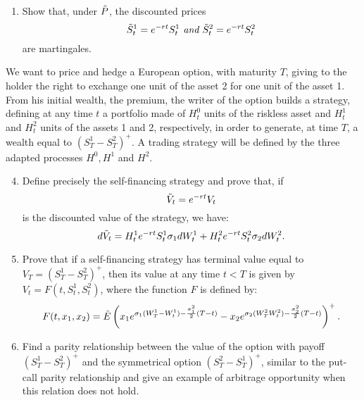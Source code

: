 \documentclass[11pt,a4,table]{article}
\begin{document}
\begin{enumerate}
\begin{enumerate}
        \item Show that, under $\Tilde{P}$, the discounted prices
        \begin{equation*}
            \Tilde{S}_t^1=e^{-rt}S_t^1 \textit{ and } \Tilde{S}_t^2 = e^{-rt} S_t^2
        \end{equation*}
        are martingales.
    \end{enumerate}
    
    We want to price and hedge a European option, with maturity $T$, giving to the holder the right to exchange one unit of the asset 2 for one unit of the asset 1. From his initial wealth, the premium, the writer of the option builds a strategy, defining at any time $t$ a portfolio made of $H_t^0$ units of the riskless asset and $H_t^1$ and $H_t^2$ units of the assets 1 and 2, respectively, in order to generate, at time $T$, a wealth equal to $(S_T^1-S_T^2)^+$. A trading strategy will be defined by the three adapted processes $H^0, H^1$ and $H^2$.
    \begin{enumerate}
        \setcounter{enumii}{3}
        
        \item Define precisely the self-financing strategy and prove that, if
        \begin{equation*}
            \Tilde{V}_t = e^{-rt} V_t
        \end{equation*}
        is the discounted value of the strategy, we have:
        \begin{equation*}
            d\Tilde{V}_t = H_t^1 e^{-rt} S_t^1\sigma_1 dW_t^1 + H_t^2 e^{-rt} S_t^2 \sigma_2 dW_t^2.
        \end{equation*}
        
        \item Prove that if a self-financing strategy has terminal value equal to $V_T=(S_T^1-S_T^2)^+$, then its value at any time $t<T$ is given by $V_t=F(t,S_t^1,S_t^2)$, where the function $F$ is defined by:
        \begin{equation}
            F(t,x_1,x_2) = \Tilde{E}\left(x_1e^{\sigma_1(W_T^1-W_t^1)-\frac{\sigma_1^2}{2}(T-t)}-x_2e^{\sigma_2(W_T^2W_t^2)-\frac{\sigma_2^2}{2}(T-t)}\right)^+.
        \end{equation}
        
        \item Find a parity relationship between the value of the option with payoff $(S_T^1-S_T^2)^+$ and the symmetrical option $(S_T^2-S_T^1)^+$, similar to the put-call parity relationship and give an example of arbitrage opportunity when this relation does not hold.
        

\end{enumerate}
\end{enumerate}
\end{document}
